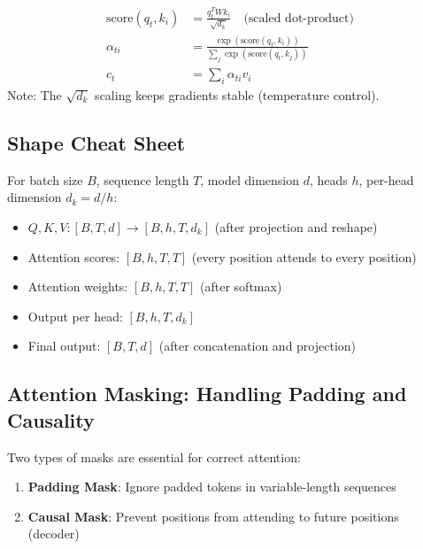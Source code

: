 \documentclass{article}
\begin{document}
\begin{tcolorbox}[colback=blue!5!white, colframe=blue!50!black, title=The Attention Computation]
\begin{align}
\text{score}(q_t, k_i) &= \frac{q_t^T W k_i}{\sqrt{d_k}} \quad \text{(scaled dot-product)} \\
\alpha_{ti} &= \frac{\exp(\text{score}(q_t, k_i))}{\sum_j \exp(\text{score}(q_t, k_j))} \\
c_t &= \sum_i \alpha_{ti} v_i
\end{align}
Note: The $\sqrt{d_k}$ scaling keeps gradients stable (temperature control).
\end{tcolorbox}

\subsection{Shape Cheat Sheet}

\begin{tcolorbox}[colback=gray!5!white, colframe=gray!50!black, title=Tensor Shapes Quick Reference]
For batch size $B$, sequence length $T$, model dimension $d$, heads $h$, per-head dimension $d_k = d/h$:
\begin{itemize}
    \item $Q, K, V: [B, T, d] \rightarrow [B, h, T, d_k]$ (after projection and reshape)
    \item Attention scores: $[B, h, T, T]$ (every position attends to every position)
    \item Attention weights: $[B, h, T, T]$ (after softmax)
    \item Output per head: $[B, h, T, d_k]$
    \item Final output: $[B, T, d]$ (after concatenation and projection)
\end{itemize}
\end{tcolorbox}

\subsection{Attention Masking: Handling Padding and Causality}

\begin{tcolorbox}[colback=red!5!white, colframe=red!50!black, title=Critical: Masking in Attention]
Two types of masks are essential for correct attention:
\begin{enumerate}
    \item \textbf{Padding Mask}: Ignore padded tokens in variable-length sequences
    \item \textbf{Causal Mask}: Prevent positions from attending to future positions (decoder)
\end{enumerate}
\end{tcolorbox}
\end{document}
